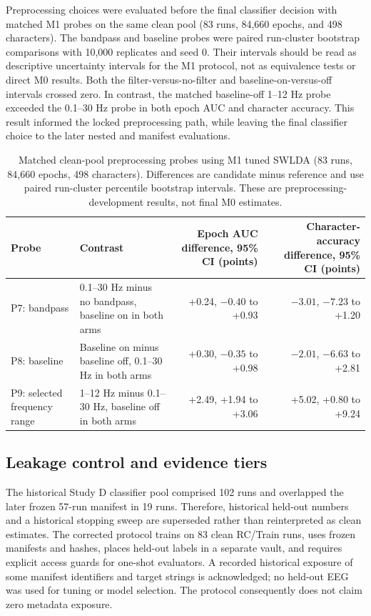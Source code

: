 \documentclass[final,5p,times,twocolumn,authoryear]{elsarticle}
\begin{document}
Preprocessing choices were evaluated before the final classifier decision with matched M1 probes on the same clean pool (83 runs, 84,660 epochs, and 498 characters). The bandpass and baseline probes were paired run-cluster bootstrap comparisons with 10,000 replicates and seed 0. Their intervals should be read as descriptive uncertainty intervals for the M1 protocol, not as equivalence tests or direct M0 results. Both the filter-versus-no-filter and baseline-on-versus-off intervals crossed zero. In contrast, the matched baseline-off 1--12 Hz probe exceeded the 0.1--30 Hz probe in both epoch AUC and character accuracy. This result informed the locked preprocessing path, while leaving the final classifier choice to the later nested and manifest evaluations.

\begin{table}[t]
\centering\small
\caption{Matched clean-pool preprocessing probes using M1 tuned SWLDA (83 runs, 84,660 epochs, 498 characters). Differences are candidate minus reference and use paired run-cluster percentile bootstrap intervals. These are preprocessing-development results, not final M0 estimates.}\label{tab:preprocessing}
\begin{tabular}{p{}p{}rr}
\toprule
Probe & Contrast & Epoch AUC difference, 95\% CI (points) & Character-accuracy difference, 95\% CI (points)\\
\midrule
P7: bandpass & 0.1--30 Hz minus no bandpass, baseline on in both arms & +0.24, $-0.40$ to +0.93 & $-3.01$, $-7.23$ to +1.20\\
P8: baseline & Baseline on minus baseline off, 0.1--30 Hz in both arms & +0.30, $-0.35$ to +0.98 & $-2.01$, $-6.63$ to +2.81\\
P9: selected frequency range & 1--12 Hz minus 0.1--30 Hz, baseline off in both arms & +2.49, +1.94 to +3.06 & +5.02, +0.80 to +9.24\\
\bottomrule
\end{tabular}
\end{table}

\subsection{Leakage control and evidence tiers}
The historical Study D classifier pool comprised 102 runs and overlapped the later frozen 57-run manifest in 19 runs. Therefore, historical held-out numbers and a historical stopping sweep are superseded rather than reinterpreted as clean estimates. The corrected protocol trains on 83 clean RC/Train runs, uses frozen manifests and hashes, places held-out labels in a separate vault, and requires explicit access guards for one-shot evaluators. A recorded historical exposure of some manifest identifiers and target strings is acknowledged; no held-out EEG was used for tuning or model selection. The protocol consequently does not claim zero metadata exposure.
\end{document}
